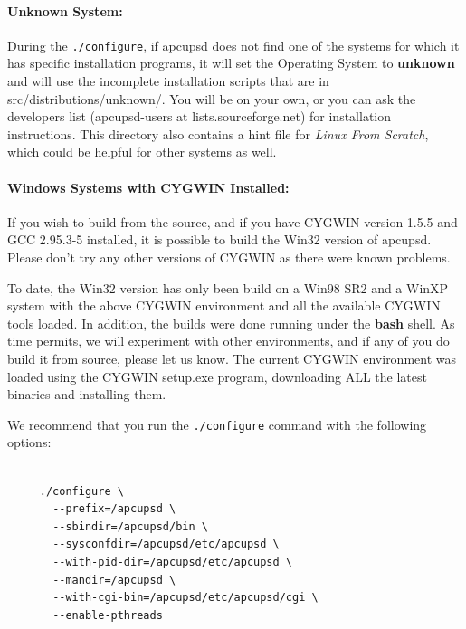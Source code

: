 \paragraph*{Unknown System:}

\label{index-Unknown-System-53}
\label{index-OS_002c-Unknown-System-54}
During the {\tt ./configure}, if apcupsd does not find one of the systems for
which it has specific installation programs, it will set the Operating System
to {\bf unknown} and will use the incomplete installation scripts that are in
\lt{}src\gt{}/distributions/unknown/. You will be on your own, or you can ask
the developers list (apcupsd-users at lists.sourceforge.net) for installation
instructions. This directory also contains a hint file for {\it Linux From
Scratch}, which could be helpful for other systems as well. 

\label{Windows-Systems-with-CYGWIN-Installed}

\paragraph*{Windows Systems with CYGWIN Installed:}

\label{index-Windows-55}
\label{index-OS_002c-Windows-56}
If you wish to build from the source, and if you have CYGWIN version 1.5.5 and
GCC 2.95.3-5 installed, it is possible to build the Win32 version of apcupsd.
Please don't try any other versions of CYGWIN as there were known problems.  

To date, the Win32 version has only been build on a Win98 SR2 and a WinXP
system with the above CYGWIN environment and all the available CYGWIN tools
loaded. In addition, the builds were done running under the {\bf bash} shell.
As time permits, we will experiment with other environments, and if any of you
do build it from source, please let us know. The current CYGWIN environment
was loaded using the CYGWIN setup.exe program, downloading ALL the latest
binaries and installing them.  

We recommend that you run the {\tt ./configure} command with the following
options: 

\footnotesize
\begin{verbatim}
     
     ./configure \
       --prefix=/apcupsd \
       --sbindir=/apcupsd/bin \
       --sysconfdir=/apcupsd/etc/apcupsd \
       --with-pid-dir=/apcupsd/etc/apcupsd \
       --mandir=/apcupsd \
       --with-cgi-bin=/apcupsd/etc/apcupsd/cgi \
       --enable-pthreads
\end{verbatim}
\normalsize

